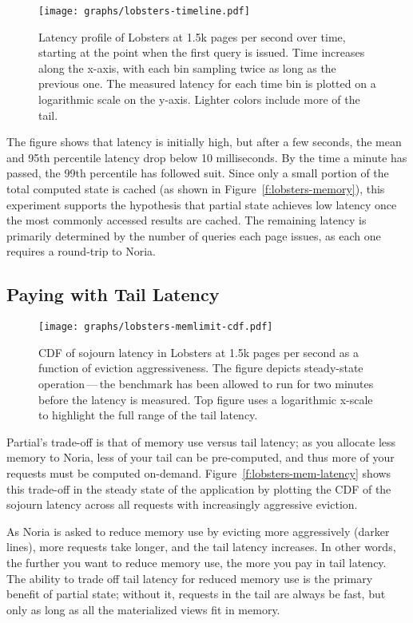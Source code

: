 \begin{figure}[t]
  \centering
  \texttt{[image: graphs/lobsters-timeline.pdf]}
  \caption{Latency profile of Lobsters at 1.5k pages per second over time,
  starting at the point when the first query is issued. Time increases along the
  x-axis, with each bin sampling twice as long as the previous one. The measured
  latency for each time bin is plotted on a logarithmic scale on the y-axis.
  Lighter colors include more of the tail.}
  \label{f:lobsters-timeline}
\end{figure}

The figure shows that latency is initially high, but after a few seconds, the
mean and 95th percentile latency drop below 10 milliseconds. By the time a
minute has passed, the 99th percentile has followed suit. Since only a small
portion of the total computed state is cached (as shown in
Figure~\vref{f:lobsters-memory}), this experiment supports the hypothesis that
partial state achieves low latency once the most commonly accessed results are
cached. The remaining latency is primarily determined by the number of queries
each page issues, as each one requires a round-trip to Noria.

\subsection{Paying with Tail Latency}

\begin{figure}[h]
  \centering
  \texttt{[image: graphs/lobsters-memlimit-cdf.pdf]}
  \caption{CDF of sojourn latency in Lobsters at 1.5k pages per second as
  a function of eviction aggressiveness. The figure depicts steady-state
  operation\,---\,the benchmark has been allowed to run for two minutes before
  the latency is measured. Top figure uses a logarithmic x-scale to highlight
  the full range of the tail latency.}
  \label{f:lobsters-mem-latency}
\end{figure}

Partial's trade-off is that of memory use versus tail latency; as you allocate
less memory to Noria, less of your tail can be pre-computed, and thus more of
your requests must be computed on-demand. Figure~\vref{f:lobsters-mem-latency}
shows this trade-off in the steady state of the application by plotting the CDF
of the sojourn latency across all requests with increasingly aggressive
eviction.

As Noria is asked to reduce memory use by evicting more aggressively (darker
lines), more requests take longer, and the tail latency increases. In other
words, the further you want to reduce memory use, the more you pay in tail
latency. The ability to trade off tail latency for reduced memory use is the
primary benefit of partial state; without it, requests in the tail are always be
fast, but only as long as all the materialized views fit in memory.


